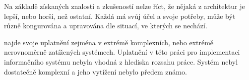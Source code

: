 Na základě získaných znalostí a zkušeností nelze říct, že nějaká z architektur je lepší, nebo horší, než ostatní.
Každá má svůj účel a svoje potřeby, může být různě kongurována a upravována dle situací, ve kterých se nechází.

 najde svoje uplatnění zejména v extrémě komplexních, nebo extrémě nerovnoměrně zatížených systémech.
Uplatnění  v této práci pro implementaci informačního systému nebyla vhodná z hlediska rozsahu práce.
Systém nebyl dostatečně komplexní a jeho vytížení nebylo předem známo.
